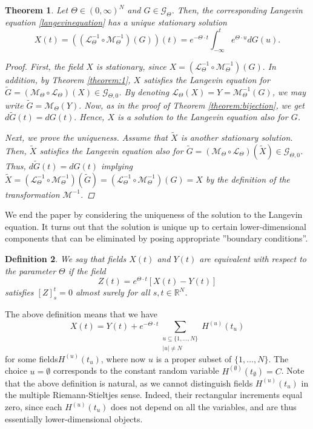 \documentclass[english, a4paper, 12pt,reqno]{amsart}
\newtheorem{defi}{Definition}[section]
\newtheorem{theorem}[defi]{Theorem}
\begin{document}
\begin{theorem}
\label{theorem:2}
Let $\Theta \in(0, \infty)^{N}$ and $G \in \mathcal{G}_{\Theta}$. Then, the corresponding Langevin equation \eqref{langevinequation} has a unique stationary solution
$$X(t) = \left((\mathcal{L}_\Theta^{-1} \circ \mathcal{M}_\Theta^{-1} )(G)\right)(t) =  e^{-\Theta\cdot t}\int_{-\infty}^{t} e^{\Theta\cdot u} dG(u).$$
\begin{proof}
First, the field $X$ is stationary, since $X = (\mathcal{L}_\Theta^{-1} \circ \mathcal{M}_\Theta^{-1} )(G).$ In addition, by Theorem \ref{theorem:1}, $X$ satisfies the Langevin equation for $ \tilde{G} = ( \mathcal{M}_\Theta \circ \mathcal{L}_\Theta)(X)\in \mathcal{G}_{\Theta,0}$. By denoting $\mathcal{L}_\Theta(X) = Y = \mathcal{M}_\Theta^{-1}(G)$, we may write $\tilde{G} = \mathcal{M}_\Theta(Y).$ Now, as in the proof of Theorem \ref{theorem:bijection}, we get $d\tilde{G}(t) = dG(t).$ Hence, $X$ is a solution to the Langevin equation also for $G$.

Next, we prove the uniqueness. Assume that $\tilde{X}$ is another stationary solution. Then, $\tilde{X}$ satisfies the Langevin equation also for $\tilde{G} = ( \mathcal{M}_\Theta \circ \mathcal{L}_\Theta)(\tilde{X})\in\mathcal{G}_{\Theta,0}$. Thus, $d\tilde{G}(t) = dG(t)$ implying $\tilde{X} = (\mathcal{L}_\Theta^{-1} \circ \mathcal{M}_\Theta^{-1} )(\tilde{G}) = (\mathcal{L}_\Theta^{-1} \circ \mathcal{M}_\Theta^{-1} )(G) = X$ by the definition of the transformation $\mathcal{M}^{-1}$.
\end{proof}
\end{theorem}




We end the paper by considering the uniqueness of the solution to the Langevin equation. It turns out that the solution is unique up to certain lower-dimensional components that can be eliminated by posing appropriate ''boundary conditions''.
\begin{defi}
\label{defi:uniqueness}
    We say that fields $X(t)$ and $Y(t)$ are equivalent with respect to the parameter $\Theta$ if the field
    $$
    Z(t) = e^{\Theta \cdot t}[X(t)- Y(t)] 
    $$
    satisfies $[Z]_s^t = 0$ almost surely for all $s,t\in \mathbb{R}^N$.
\end{defi}
The above definition means that we have
\begin{equation}
\label{eq:XY-link}
X(t) = Y(t) + e^{-\Theta \cdot t}\sum_{\substack{u\subseteq \{1,\dots,N\}\\
|u| \neq N}}H^{(u)}(t_u)
\end{equation}
for some fields$H^{(u)}(t_u)$, where now $u$ is a proper subset of $\{1,\ldots,N\}$. The choice $u = \emptyset$ corresponds to the constant random variable $H^{(\emptyset)} (t_\emptyset) =C$. Note that the above definition is natural, as we cannot distinguish fields $H^{(u)}(t_u)$ in the multiple Riemann-Stieltjes sense. Indeed, their rectangular increments equal zero, since each $H^{(u)}(t_u)$ does not depend on all the variables, and are thus essentially lower-dimensional objects. 
\end{document}
